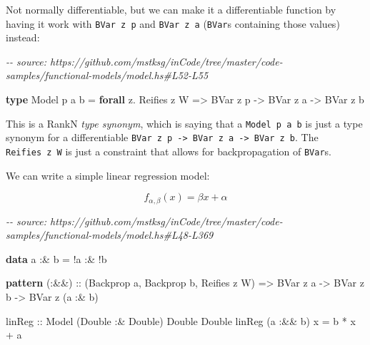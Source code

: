 \documentclass[]{article}
\newenvironment{Shaded}{}{}
\newcommand{\CommentTok}[1]{\textcolor[rgb]{0.38,0.63,0.69}{\textit{#1}}}
\newcommand{\DataTypeTok}[1]{\textcolor[rgb]{0.56,0.13,0.00}{#1}}
\newcommand{\KeywordTok}[1]{\textcolor[rgb]{0.00,0.44,0.13}{\textbf{#1}}}
\newcommand{\NormalTok}[1]{#1}
\newcommand{\OperatorTok}[1]{\textcolor[rgb]{0.40,0.40,0.40}{#1}}
\newcommand{\OtherTok}[1]{\textcolor[rgb]{0.00,0.44,0.13}{#1}}
\begin{document}
Not normally differentiable, but we can make it a differentiable function by
having it work with \texttt{BVar\ z\ p} and \texttt{BVar\ z\ a} (\texttt{BVar}s
containing those values) instead:

\begin{Shaded}
\begin{Highlighting}[]
\CommentTok{{-}{-} source: https://github.com/mstksg/inCode/tree/master/code{-}samples/functional{-}models/model.hs\#L52{-}L55}

\KeywordTok{type} \DataTypeTok{Model}\NormalTok{ p a b }\OtherTok{=} \KeywordTok{forall}\NormalTok{ z}\OperatorTok{.} \DataTypeTok{Reifies}\NormalTok{ z }\DataTypeTok{W}
                \OtherTok{=\textgreater{}} \DataTypeTok{BVar}\NormalTok{ z p}
                \OtherTok{{-}\textgreater{}} \DataTypeTok{BVar}\NormalTok{ z a}
                \OtherTok{{-}\textgreater{}} \DataTypeTok{BVar}\NormalTok{ z b}
\end{Highlighting}
\end{Shaded}

This is a RankN \emph{type synonym}, which is saying that a
\texttt{Model\ p\ a\ b} is just a type synonym for a differentiable
\texttt{BVar\ z\ p\ -\textgreater{}\ BVar\ z\ a\ -\textgreater{}\ BVar\ z\ b}.
The \texttt{Reifies\ z\ W} is just a constraint that allows for backpropagation
of \texttt{BVar}s.

We can write a simple linear regression model:

\[
f_{\alpha, \beta}(x) = \beta x + \alpha
\]

\begin{Shaded}
\begin{Highlighting}[]
\CommentTok{{-}{-} source: https://github.com/mstksg/inCode/tree/master/code{-}samples/functional{-}models/model.hs\#L48{-}L369}

\KeywordTok{data}\NormalTok{ a }\OperatorTok{:\&}\NormalTok{ b }\OtherTok{=} \OperatorTok{!}\NormalTok{a }\OperatorTok{:\&} \OperatorTok{!}\NormalTok{b}

\KeywordTok{pattern}\OtherTok{ (:\&\&) ::}\NormalTok{ (}\DataTypeTok{Backprop}\NormalTok{ a, }\DataTypeTok{Backprop}\NormalTok{ b, }\DataTypeTok{Reifies}\NormalTok{ z }\DataTypeTok{W}\NormalTok{)}
              \OtherTok{=\textgreater{}} \DataTypeTok{BVar}\NormalTok{ z a }\OtherTok{{-}\textgreater{}} \DataTypeTok{BVar}\NormalTok{ z b }\OtherTok{{-}\textgreater{}} \DataTypeTok{BVar}\NormalTok{ z (a }\OperatorTok{:\&}\NormalTok{ b)}

\OtherTok{linReg ::} \DataTypeTok{Model}\NormalTok{ (}\DataTypeTok{Double} \OperatorTok{:\&} \DataTypeTok{Double}\NormalTok{) }\DataTypeTok{Double} \DataTypeTok{Double}
\NormalTok{linReg (a }\OperatorTok{:\&\&}\NormalTok{ b) x }\OtherTok{=}\NormalTok{ b }\OperatorTok{*}\NormalTok{ x }\OperatorTok{+}\NormalTok{ a}
\end{Highlighting}
\end{Shaded}
\end{document}

